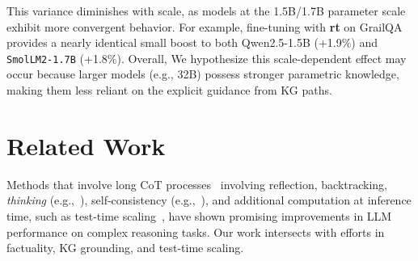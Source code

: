 \documentclass[11pt]{article}
\newcommand{\dataset}{\textbf{fs1}}
\newcommand{\datasetrt}{\textbf{\textbf{rt}}}
\begin{document}
This variance diminishes with scale, as models at the 1.5B/1.7B parameter scale exhibit more convergent behavior. For example, fine-tuning with \textbf{rt} on GrailQA provides a nearly identical small boost to both {Qwen2.5-1.5B} (+1.9\%) and \texttt{SmolLM2-1.7B} (+1.8\%). Overall, We hypothesize this scale-dependent effect may occur because larger models (e.g., 32B) possess stronger parametric knowledge, making them less reliant on the explicit guidance from KG paths.
\vspace{-0.5em}
\begin{center}
%
\end{center}


\section{Related Work}\label{related-work}
Methods that involve long CoT processes~\citep{kojima2022large,wei2022chain} involving reflection, backtracking, \emph{thinking} (e.g.,~\citealp{deepseekai2025deepseekr1incentivizingreasoningcapability, muennighoff2025s1simpletesttimescaling}), self-consistency (e.g.,~\citealp{wang2022self}), and additional computation at inference time, such as test-time scaling~\citep{wu2024inference,muennighoff2025s1simpletesttimescaling,zhang2025whathowwherewell}, have shown promising improvements in LLM performance on complex reasoning tasks. Our work intersects with efforts in factuality, KG grounding, and test-time scaling.
\end{document}
